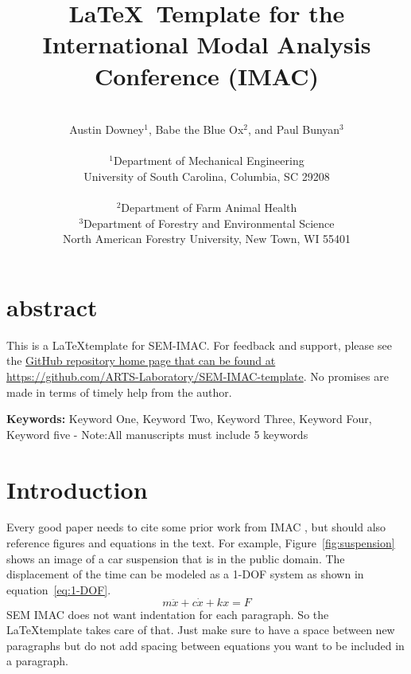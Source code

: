 \documentclass[10pt,letterpaper]{article}
\newcommand{\keywords}[1]{\vspace{2ex} \noindent \textbf{Keywords:} #1}
\begin{document}
	\date{} %
	
	\title{\LaTeX\ Template for the International Modal Analysis Conference (IMAC)}
	
	\author{\vspace{.25in}\\
	Austin Downey$^1$, Babe the Blue Ox$^2$, and Paul Bunyan$^3$\\ \\ %
	 $^1$Department of Mechanical Engineering \\
		University of South Carolina, Columbia, SC 29208 \\ \\ %
	 $^2$Department of Farm Animal Health \\
	 $^3$Department of Forestry and Environmental Science \\
		North American Forestry University, New Town, WI 55401 \\
	}
	\maketitle
	
	\section{abstract}
		This is a \LaTeX template for SEM-IMAC. For feedback and support, please see the \href{https://github.com/ARTS-Laboratory/SEM-IMAC-template}{GitHub repository home page that can be found at https://github.com/ARTS-Laboratory/SEM-IMAC-template}. No promises are made in terms of timely help from the author. 
	
	\keywords{Keyword One, Keyword Two, Keyword Three, Keyword Four, Keyword five - Note:All manuscripts must include 5 keywords}
	
	\section{Introduction}
	
		Every good paper needs to cite some prior work from IMAC \cite{Downey2021OpenVibrations,Ishrat2019RealtimeForecasting,Downey2020Millisecondmodelupdating,Downey2016HighCapacityVariable}, but should also reference figures and equations in the text. For example, Figure~\ref{fig:suspension} shows an image of a car suspension that is in the public domain. The displacement of the time can be modeled as a 1-DOF system as shown in equation~\ref{eq:1-DOF}.
		\begin{equation}
		m\ddot{x} + c\dot{x} + kx = F
		\label{eq:1-DOF}
		\end{equation}
		SEM IMAC does not want indentation for each paragraph. So the \LaTeX template takes care of that. Just make sure to have a space between new paragraphs but do not add spacing between equations you want to be included in a paragraph. 
		
\end{document}
